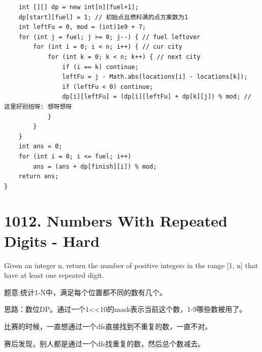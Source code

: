 \documentclass[9pt, b5paaper]{book}
\begin{document}
\begin{verbatim}
    int [][] dp = new int[n][fuel+1];
    dp[start][fuel] = 1; // 初始点且燃料满的点方案数为1
    int leftFu = 0, mod = (int)1e9 + 7;
    for (int j = fuel; j >= 0; j--) { // fuel leftover
        for (int i = 0; i < n; i++) { // cur city
            for (int k = 0; k < n; k++) { // next city
                if (i == k) continue;
                leftFu = j - Math.abs(locations[i] - locations[k]);
                if (leftFu < 0) continue;
                dp[i][leftFu] = (dp[i][leftFu] + dp[k][j]) % mod; // 这里好别扭呀: 想呀想呀 
            }
        }
    }
    int ans = 0;
    for (int i = 0; i <= fuel; i++) 
        ans = (ans + dp[finish][i]) % mod;
    return ans;
}
\end{verbatim}

\section{1012. Numbers With Repeated Digits - Hard}
\label{sec-2-13}
Given an integer n, return the number of positive integers in the range [1, n] that have at least one repeated digit.

题意:统计1-N中，满足每个位置都不同的数有几个。

思路：数位DP。通过一个1<<10的mask表示当前这个数，1-9哪些数被用了。

比赛的时候，一直想通过一个dfs直接找到不重复的数，一直不对。

赛后发现，别人都是通过一个dfs找重复的数，然后总个数减去。
\end{document}
